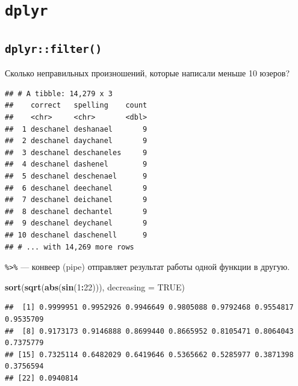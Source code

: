 \documentclass[]{book}
\newenvironment{Shaded}{\begin{snugshade}}{\end{snugshade}}
\newcommand{\DataTypeTok}[1]{\textcolor[rgb]{0.13,0.29,0.53}{#1}}
\newcommand{\DecValTok}[1]{\textcolor[rgb]{0.00,0.00,0.81}{#1}}
\newcommand{\KeywordTok}[1]{\textcolor[rgb]{0.13,0.29,0.53}{\textbf{#1}}}
\newcommand{\NormalTok}[1]{#1}
\newcommand{\OperatorTok}[1]{\textcolor[rgb]{0.81,0.36,0.00}{\textbf{#1}}}
\newcommand{\OtherTok}[1]{\textcolor[rgb]{0.56,0.35,0.01}{#1}}
\newcommand{\StringTok}[1]{\textcolor[rgb]{0.31,0.60,0.02}{#1}}
\begin{document}
\hypertarget{dplyr}{%
\section{\texorpdfstring{\texttt{dplyr}}{dplyr}}\label{dplyr}}

\hypertarget{dplyrfilter}{%
\subsection{\texorpdfstring{\texttt{dplyr::filter()}}{dplyr::filter()}}\label{dplyrfilter}}

Сколько неправильных произношений, которые написали меньше 10 юзеров?

\begin{Shaded}
\end{Shaded}

\begin{verbatim}
## # A tibble: 14,279 x 3
##    correct   spelling    count
##    <chr>     <chr>       <dbl>
##  1 deschanel deshanael       9
##  2 deschanel daychanel       9
##  3 deschanel deschaneles     9
##  4 deschanel dashenel        9
##  5 deschanel deschenael      9
##  6 deschanel deechanel       9
##  7 deschanel deichanel       9
##  8 deschanel dechantel       9
##  9 deschanel deychanel       9
## 10 deschanel daschenell      9
## # ... with 14,269 more rows
\end{verbatim}

\texttt{\%\textgreater{}\%} --- конвеер (pipe) отправляет результат работы одной функции в другую.

\begin{Shaded}
\begin{Highlighting}[]
\KeywordTok{sort}\NormalTok{(}\KeywordTok{sqrt}\NormalTok{(}\KeywordTok{abs}\NormalTok{(}\KeywordTok{sin}\NormalTok{(}\DecValTok{1}\OperatorTok{:}\DecValTok{22}\NormalTok{))), }\DataTypeTok{decreasing =} \OtherTok{TRUE}\NormalTok{)}
\end{Highlighting}
\end{Shaded}

\begin{verbatim}
##  [1] 0.9999951 0.9952926 0.9946649 0.9805088 0.9792468 0.9554817 0.9535709
##  [8] 0.9173173 0.9146888 0.8699440 0.8665952 0.8105471 0.8064043 0.7375779
## [15] 0.7325114 0.6482029 0.6419646 0.5365662 0.5285977 0.3871398 0.3756594
## [22] 0.0940814
\end{verbatim}
\end{document}
